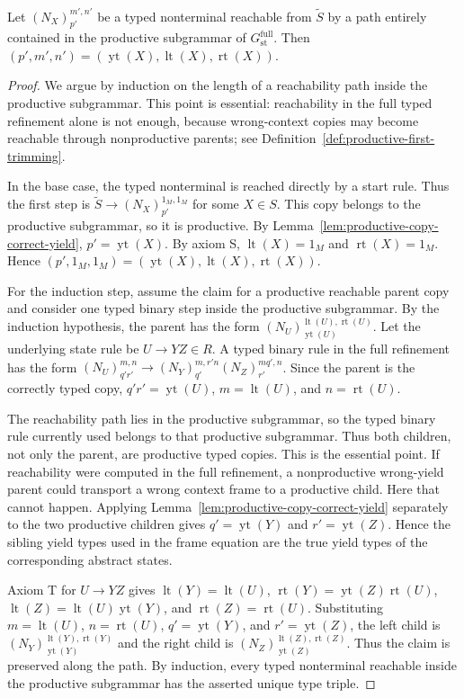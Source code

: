 \documentclass[sub]{jalc}
\newcommand{\yt}{\operatorname{yt}}
\newcommand{\lt}{\operatorname{lt}}
\newcommand{\rt}{\operatorname{rt}}
\newcommand{\eM}{1_M}
\begin{document}
\begin{lemma}
\label{lem:context-type-uniqueness}
Let \((N_X)_{p'}^{m',n'}\) be a typed nonterminal reachable from \(\widetilde S\) by a path entirely contained in the productive subgrammar of \(G_{\mathrm{st}}^{\mathrm{full}}\). Then \((p',m',n')=(\yt(X),\lt(X),\rt(X))\).
\end{lemma}

\begin{proof}
We argue by induction on the length of a reachability path inside the productive subgrammar. This point is essential: reachability in the full typed refinement alone is not enough, because wrong-context copies may become reachable through nonproductive parents; see Definition~\ref{def:productive-first-trimming}.

In the base case, the typed nonterminal is reached directly by a start rule. Thus the first step is \(\widetilde S\to (N_X)_{p'}^{\eM,\eM}\) for some \(X\in S\). This copy belongs to the productive subgrammar, so it is productive. By Lemma~\ref{lem:productive-copy-correct-yield}, \(p'=\yt(X)\). By axiom S, \(\lt(X)=\eM\) and \(\rt(X)=\eM\). Hence \((p',\eM,\eM)=(\yt(X),\lt(X),\rt(X))\).

For the induction step, assume the claim for a productive reachable parent copy and consider one typed binary step inside the productive subgrammar. By the induction hypothesis, the parent has the form \((N_U)_{\yt(U)}^{\lt(U),\rt(U)}\). Let the underlying state rule be \(U\to YZ\in R\). A typed binary rule in the full refinement has the form \((N_U)_{q'r'}^{m,n}\to (N_Y)_{q'}^{m,r'n}(N_Z)_{r'}^{mq',n}\). Since the parent is the correctly typed copy, \(q'r'=\yt(U)\), \(m=\lt(U)\), and \(n=\rt(U)\).

The reachability path lies in the productive subgrammar, so the typed binary rule currently used belongs to that productive subgrammar. Thus both children, not only the parent, are productive typed copies. This is the essential point. If reachability were computed in the full refinement, a nonproductive wrong-yield parent could transport a wrong context frame to a productive child. Here that cannot happen. Applying Lemma~\ref{lem:productive-copy-correct-yield} separately to the two productive children gives \(q'=\yt(Y)\) and \(r'=\yt(Z)\). Hence the sibling yield types used in the frame equation are the true yield types of the corresponding abstract states.

Axiom T for \(U\to YZ\) gives \(\lt(Y)=\lt(U)\), \(\rt(Y)=\yt(Z)\rt(U)\), \(\lt(Z)=\lt(U)\yt(Y)\), and \(\rt(Z)=\rt(U)\). Substituting \(m=\lt(U)\), \(n=\rt(U)\), \(q'=\yt(Y)\), and \(r'=\yt(Z)\), the left child is \((N_Y)_{\yt(Y)}^{\lt(Y),\rt(Y)}\) and the right child is \((N_Z)_{\yt(Z)}^{\lt(Z),\rt(Z)}\). Thus the claim is preserved along the path. By induction, every typed nonterminal reachable inside the productive subgrammar has the asserted unique type triple.
\end{proof}
\end{document}
